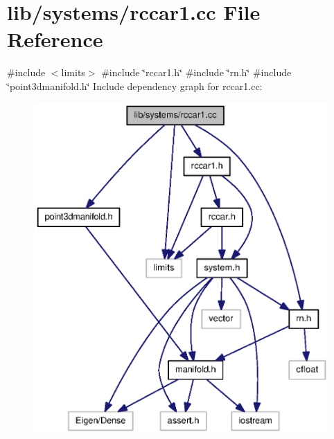 \section{lib/systems/rccar1.cc \-File \-Reference}
\label{rccar1_8cc}
{\ttfamily \#include $<$limits$>$}\*
{\ttfamily \#include \char`\"{}rccar1.\-h\char`\"{}}\*
{\ttfamily \#include \char`\"{}rn.\-h\char`\"{}}\*
{\ttfamily \#include \char`\"{}point3dmanifold.\-h\char`\"{}}\*
\-Include dependency graph for rccar1.\-cc\-:
\nopagebreak
\begin{figure}[H]
\begin{center}
\leavevmode
\includegraphics[width=350pt]{rccar1_8cc__incl}
\end{center}
\end{figure}
